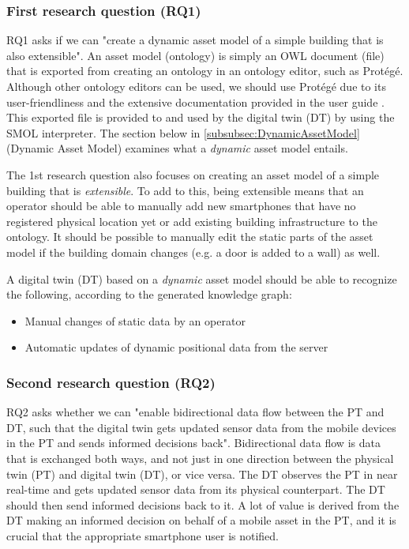 \documentclass{article}
\begin{document}
\subsubsection{First research question (RQ1)}
RQ1 asks if we can "create a dynamic asset model of a simple building that is also extensible". An asset model (ontology) is simply an OWL document (file) that is exported from creating an ontology in an ontology editor, such as Protégé. Although other ontology editors can be used, we should use Protégé due to its user-friendliness and the extensive documentation provided in the user guide \cite{horridge_practical_2011}. This exported file is provided to and used by the digital twin (DT) by using the SMOL interpreter. The section below in \ref{subsubsec:DynamicAssetModel}(Dynamic Asset Model) examines what a \emph{dynamic} asset model entails. 

The 1st research question also focuses on creating an asset model of a simple building that is \emph{extensible}. To add to this, being extensible means that an operator should be able to manually add new smartphones that have no registered physical location yet or add existing building infrastructure to the ontology. It should be possible to manually edit the static parts of the asset model if the building domain changes (e.g. a door is added to a wall) as well. 

A digital twin (DT) based on a \emph{dynamic} asset model should be able to recognize the following, according to the generated knowledge graph:
\begin{itemize}
    \item Manual changes of static data by an operator
    \item Automatic updates of dynamic positional data from the server
\end{itemize}

\subsubsection{Second research question (RQ2)}
RQ2 asks whether we can "enable bidirectional data flow between the PT and DT, such that the digital twin gets updated sensor data from the mobile devices in the PT and sends informed decisions back". Bidirectional data flow is data that is exchanged both ways, and not just in one direction between the physical twin (PT) and digital twin (DT), or vice versa. The DT observes the PT in near real-time and gets updated sensor data from its physical counterpart. The DT should then send informed decisions back to it. A lot of value is derived from the DT making an informed decision on behalf of a mobile asset in the PT, and it is crucial that the appropriate smartphone user is notified.
\end{document}

